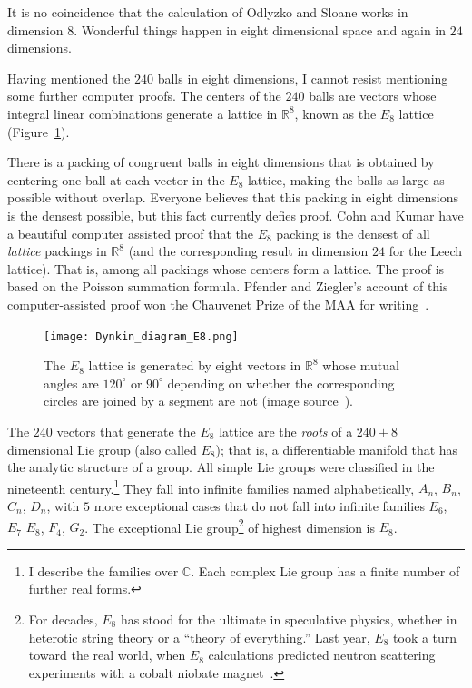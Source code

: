 \documentclass{llncs}
\newcommand{\ring}[1]{\mathbb{#1}}
\begin{document}
It is no coincidence that the calculation of Odlyzko and Sloane works
in dimension $8$.  Wonderful things happen in eight dimensional space
and again in $24$ dimensions.

Having mentioned the $240$ balls in eight dimensions, I cannot resist
mentioning some further computer proofs.  The centers of the $240$ balls
are vectors whose integral linear combinations generate 
a lattice in $\ring{R}^8$, known as the $E_8$ lattice (Figure~\ref{fig:e8}).

There is a packing of congruent balls in eight dimensions that is
obtained by centering one ball at each vector in the $E_8$ lattice,
making the balls as large as possible without overlap.  Everyone
believes that this packing in eight dimensions is the densest
possible, but this fact currently defies proof.  Cohn and Kumar have a
beautiful computer assisted proof that the $E_8$ packing is the
densest of all {\it lattice} packings in $\ring{R}^8$ (and the
corresponding result in dimension $24$ for the Leech lattice).  That
is, among all packings whose centers form a lattice.  The proof is
based on the Poisson summation formula.  Pfender and Ziegler's account
of this computer-assisted proof won the Chauvenet Prize of the MAA for
writing~\cite{PZ}.


\begin{figure}[h!]
  \centering
\texttt{[image: Dynkin\_diagram\_E8.png]}
\caption{The $E_8$ lattice is generated by eight vectors in
  $\ring{R}^8$ whose mutual angles are $120^\circ$ or $90^\circ$
  depending on whether the corresponding circles are joined by a
  segment are not (image source~\cite{e8-graphic}).}
\label{fig:e8}
\end{figure}

The $240$ vectors that generate the $E_8$ lattice are the {\it roots}
of a $240+8$ dimensional Lie group (also called $E_8$); that is, a
differentiable manifold that has the analytic structure of a group.
All simple Lie groups were classified in the nineteenth
century.\footnote{I describe the families over $\ring{C}$.  Each
  complex Lie group has a finite number of further real forms.}  They
fall into infinite families named alphabetically, $A_n$, $B_n$, $C_n$,
$D_n$, with $5$ more exceptional cases that do not fall into infinite
families $E_6$, $E_7$ $E_8$, $F_4$, $G_2$.  The exceptional Lie
group\footnote{For decades, $E_8$ has stood for the ultimate in
  speculative physics, whether in heterotic string theory or a
  ``theory of everything.''  Last year, $E_8$ took a turn toward the
  real world, when $E_8$ calculations predicted neutron scattering
  experiments with a cobalt niobate magnet~\cite{BGE8}.} of highest
dimension is $E_8$.
\end{document}
